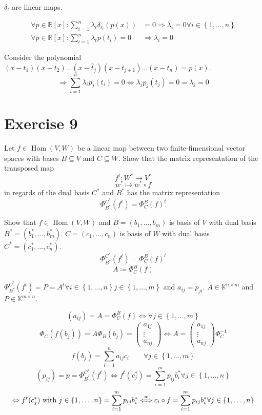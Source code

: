 \documentclass[a4paper]{article}
\theoremstyle{definition}
\DeclareMathOperator\Hom{Hom}
\newcommand\set[1]{\left\{#1\right\}}
\begin{document}
$\delta_t$ are linear maps.

\begin{align*}
  \forall p \in \mathbb R[x]: \sum_{i=1}^n \lambda_t \delta_{t_i}(p(x))
    &= 0 \Rightarrow \lambda_i = 0 \forall i \in \set{1, \ldots, n} \\
  \forall p \in \mathbb R[x]: \sum_{i=1}^n \lambda_t p(t_i) = 0
    &\Rightarrow \lambda_i = 0
\end{align*}

Consider the polynomial $(x - t_1)(x - t_2) \ldots (x - \hat{t}_j)(x - t_{j+1}) \ldots (x - t_n) = p(x)$.
\[ \Rightarrow \sum_{i=1}^n \lambda_i p_j(t_i) = 0 \Leftrightarrow \lambda_j p_j(t_j) = 0 = \lambda_j = 0 \]

\section{Exercise 9}
\begin{ex}
  Let $f \in \Hom(V, W)$ be a linear map between two finite-fimensional vector spaces
  with bases $B \subseteq V$ and $C \subseteq W$. Show that the matrix representation
  of the transposed map
  \[ f^t: W^* \to V^* \]
  \[ w^* \mapsto w^* \circ f \]
  in regards of the dual basis $C^*$ and $B^*$ has the matrix representation
  \[ \Phi_{B^*}^{C^*}(f^t) = \Phi_C^B(f)^t \]
\end{ex}

Show that $f \in \Hom(V, W)$ and $B = (b_1, \ldots, b_m)$ is basis of $V$ with dual basis $B^* = (b_1^*, \ldots, b_m^*)$.
$C = (c_1, \ldots, c_n)$ is basis of $W$ with dual basis $C^* = (c_1^*, \ldots, c_n^*)$.
\[ \Phi_{B^*}^{C^*}(f^t) = \Phi_C^B(f)^t \]
\[ A \coloneqq \Phi_C^B(f) \]

$\Phi_{B^*}^{C^*}(f^t) = P = A^t \forall i \in \set{1, \ldots, n} j \in \set{1, \ldots, m}$ and $a_{ij} = p_{ji}$.
$A \in \mathbb K^{n \times m}$ and $P \in \mathbb K^{m\times n}$.

\[ (a_{ij}) = A = \Phi_C^B(f) \Leftrightarrow  \forall j \in \set{1, \ldots, m} \]
\[ \Phi_C(f(b_j)) = A \Phi_B(b_j) = \begin{pmatrix} a_{1j} \\ \vdots \\ a_{nj} \end{pmatrix} \Leftrightarrow A = \begin{pmatrix} a_{1j} \\ \vdots \\ a_{nj} \end{pmatrix}  \Phi_C^{-1} \]
\[ f(b_j) = \sum_{i=1}^n a_{ij} c_i \qquad \forall j \in \set{1, \ldots, m} \]
\[ (p_{ij}) = p = \Phi_{B^*}^{C^*}(f^t) \Leftrightarrow f^t(c_j^*) = \sum_{i=1}^m p_{ij} b_i^* \forall j \in \set{1,\ldots,n} \]
\[ \Leftrightarrow f^t(c_j^*) \text{ with }j \in \set{1,\ldots, n} = \sum_{i=1}^m p_{ij} b^*_i \xLeftrightarrow{w} c_i \circ f = \sum_{i=1}^m p_{ij} b_i^* \forall j \in \set{1,\ldots,n} \]
\end{document}
